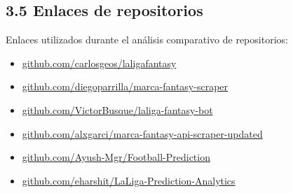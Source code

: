 \subsection{3.5 Enlaces de repositorios}

Enlaces utilizados durante el análisis comparativo de repositorios:

\begin{itemize}
\item \href{https://github.com/carlosgeos/laligafantasy}{github.com/carlosgeos/laligafantasy}
\item \href{https://github.com/diegoparrilla/marca-fantasy-scraper}{github.com/diegoparrilla/marca-fantasy-scraper}
\item \href{https://github.com/VictorBusque/laliga-fantasy-bot}{github.com/VictorBusque/laliga-fantasy-bot}
\item \href{https://github.com/alxgarci/marca-fantasy-api-scraper-updated}{github.com/alxgarci/marca-fantasy-api-scraper-updated}
\item \href{https://github.com/Ayush-Mgr/Football-Prediction}{github.com/Ayush-Mgr/Football-Prediction}
\item \href{https://github.com/eharshit/LaLiga-Prediction-Analytics}{github.com/eharshit/LaLiga-Prediction-Analytics}
\end{itemize}

